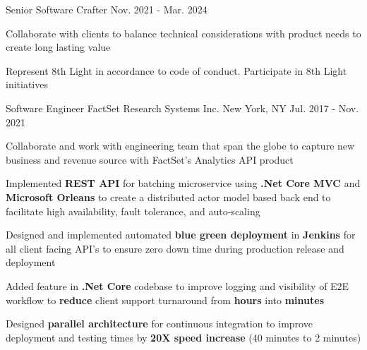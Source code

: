 \begin{cventries}
  \cventry
    {Senior Software Crafter} %
    {}
    {} %
    {Nov. 2021 - Mar. 2024} %
    {
      \begin{cvitems} %
        \item Collaborate with clients to balance technical considerations with product needs to create long lasting value
        \item Represent 8th Light in accordance to code of conduct. Participate in 8th Light initiatives
      \end{cvitems}
    }

  \cventry
    {Software Engineer} %
    {FactSet Research Systems Inc.} %
    {New York, NY} %
    {Jul. 2017 - Nov. 2021} %
    {
      \begin{cvitems} %
        \item Collaborate and work with engineering team that span the globe to capture new business and revenue source with FactSet's Analytics API product
        \item {Implemented \textbf{REST API} for batching microservice using \textbf{.Net Core MVC} and \textbf{Microsoft Orleans} to create a distributed actor model based back end to facilitate high availability, fault tolerance, and auto-scaling }
        \item Designed and implemented automated \textbf{blue green deployment} in \textbf{Jenkins} for all client facing API's to ensure zero down time during production release and deployment
        \item Added feature in \textbf{.Net Core} codebase to improve logging and visibility of E2E workflow to \textbf{reduce} client support turnaround from \textbf{hours} into \textbf{minutes}
        \item Designed \textbf{parallel architecture} for continuous integration to improve deployment and testing times by \textbf{20X speed increase} (40 minutes to 2 minutes)
      \end{cvitems}
    }


\end{cventries}
